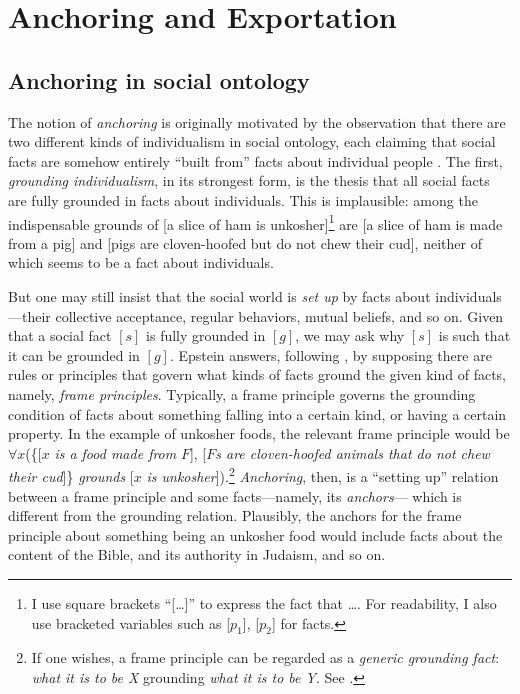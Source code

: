 \documentclass[12pt]{article}
\begin{document}
\section{Anchoring and Exportation}
\subsection{Anchoring in social ontology}
The notion of \textit{anchoring} is originally motivated by the observation that there are two different kinds of individualism in social ontology, each claiming that social facts are somehow entirely ``built from'' facts about individual people \citep{Epstein2014-EPSWII,Epstein2015-EPSTAT}. The first, \textit{grounding individualism}, in its strongest form, is the thesis that all social facts are fully grounded in facts about individuals. This is implausible: among the indispensable grounds of [a slice of ham is unkosher]\footnote{
    I use square brackets ``[\dots]'' to express the fact that \dots. For readability, I also use bracketed variables such as [$p_1$], [$p_2$] for facts. 
} are [a slice of ham is made from a pig] and [pigs are cloven-hoofed but do not chew their cud], neither of which seems to be a fact about individuals.


\par
But one may still insist that the social world is \textit{set up} by facts about individuals---their collective acceptance, regular behaviors, mutual beliefs, and so on. Given that a social fact $[s]$ is fully grounded in $[g]$, we may ask why $[s]$ is such that it can be grounded in $[g]$. Epstein answers, following \citet{Searle1995-SEATCO}, by supposing there are rules or principles that govern what kinds of facts ground the given kind of facts, namely, \textit{frame principles}. Typically, a frame principle governs the grounding condition of facts about something falling into a certain kind, or having a certain property. In the example of unkosher foods, the relevant frame principle would be $\forall x$(\{[$x$ \textit{is a food made from} $F$], [$F$\textit{s are cloven-hoofed animals that do not chew their cud}]\} \textit{grounds} [$x$ \textit{is unkosher}]).\footnote{
    If one wishes, a frame principle can be regarded as a \textit{generic grounding fact}: \textit{what it is to be X} grounding \textit{what it is to be Y}. See \citet{Fine2015-FINUFF}.
} \textit{Anchoring}, then, is a ``setting up'' relation between a frame principle and some facts---namely, its \textit{anchors}--- which is different from the grounding relation. Plausibly, the anchors for the frame principle about something being an unkosher food would include facts about the content of the Bible, and its authority in Judaism, and so on. 
\end{document}
